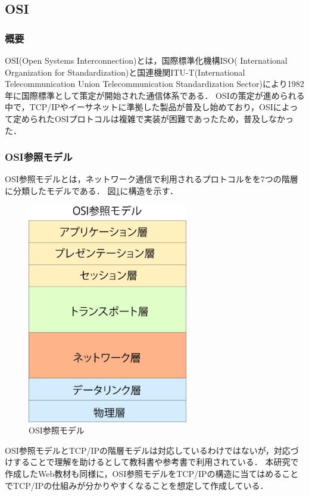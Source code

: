 \documentclass[12pt,a4j,titlepage]{ltjsarticle}
\begin{document}
\subsection{OSI}
\subsubsection{概要}
OSI(Open Systems Interconnection)とは，国際標準化機構ISO( International Organization for Standardization)と国連機関ITU-T(International Telecommunication Union Telecommunication Standardization Sector)により1982年に国際標準として策定が開始された通信体系である．
OSIの策定が進められる中で，TCP/IPやイーサネットに準拠した製品が普及し始めており，OSIによって定められたOSIプロトコルは複雑で実装が困難であったため，普及しなかった．
\subsubsection{OSI参照モデル}
OSI参照モデルとは，ネットワーク通信で利用されるプロトコルをを7つの階層に分類したモデルである．
図\ref{fig:osi}に構造を示す．

\begin{figure}[h]
\centering
\includegraphics[clip,width=70mm]{figures/osi.pdf}
\caption[OSI参照モデル]{OSI参照モデル\linebreak}
\label{fig:osi}
\end{figure}

OSI参照モデルとTCP/IPの階層モデルは対応しているわけではないが，対応づけすることで理解を助けるとして教科書や参考書で利用されている．
本研究で作成したWeb教材も同様に，OSI参照モデルをTCP/IPの構造に当てはめることでTCP/IPの仕組みが分かりやすくなることを想定して作成している．
\end{document}
